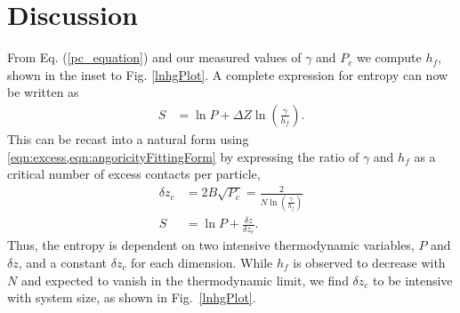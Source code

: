 \section{Discussion}
From Eq. (\ref{pc_equation}) and our measured values of $\gamma$ and $P_c$ we compute $h_f$, shown in the inset to Fig. \ref{lnhgPlot}. A complete expression for entropy can now be written as
%
\begin{align}
S &= \ln P + \Delta Z \ln\left(\frac{\gamma}{h_f}\right).
\end{align}
This can be recast into a natural form using \cref{eqn:excess,eqn:angoricityFittingForm} by expressing the ratio of $\gamma$ and $h_f$ as a critical number of excess contacts per particle, 
\begin{align}
\delta z_c &= 2B \sqrt{P_c}= \frac{2}{N\ln\left( \frac{\gamma}{h_f}\right)} \\
S &= \ln P + \frac{\delta z}{\delta z_c}. \label{eqn:finalEntropy}
\end{align}
%
Thus, the entropy is dependent on two intensive thermodynamic variables, $P$ and $\delta z$, and a constant $\delta z_c$ for each dimension. While $h_f$ is observed to decrease with $N$ and expected to vanish in the thermodynamic limit, we find $\delta z_c$ to be intensive with system size, as shown in Fig.~\ref{lnhgPlot}.

